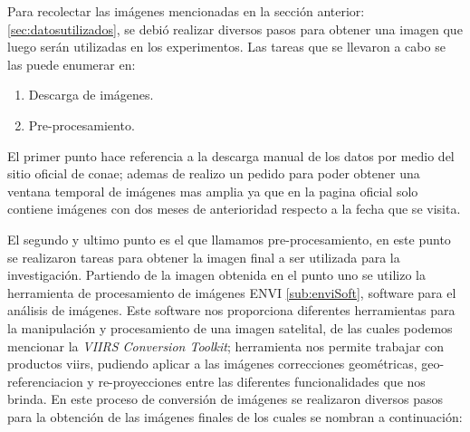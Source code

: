 Para recolectar las imágenes mencionadas en la sección anterior: \ref{sec:datosutilizados}, se debió realizar diversos pasos para obtener una imagen que luego serán utilizadas en los experimentos. Las tareas que se llevaron a cabo se las puede enumerar en:
\begin{enumerate}
	\item Descarga de imágenes.
	\item Pre-procesamiento.
\end{enumerate}

El primer punto hace referencia a la descarga manual de los datos por medio del sitio oficial de \ac{conae}; ademas de realizo un pedido para poder obtener una ventana temporal de imágenes mas amplia ya que en la pagina oficial solo contiene imágenes con dos meses de anterioridad respecto a la fecha que se visita.

El segundo y ultimo punto es el que llamamos pre-procesamiento, en este punto se realizaron tareas para obtener la imagen final a ser utilizada para la investigación.
Partiendo de la imagen obtenida en el punto uno se utilizo la herramienta de procesamiento de imágenes ENVI \ref{sub:enviSoft}, software para el análisis de imágenes. Este software nos proporciona diferentes herramientas para la manipulación y procesamiento  de  una imagen satelital, de las cuales podemos mencionar la \textit{VIIRS Conversion Toolkit}; herramienta nos permite trabajar con productos \ac{viirs}, pudiendo aplicar a las imágenes correcciones geométricas, geo-referenciacion y re-proyecciones entre las diferentes funcionalidades que nos brinda. En este proceso de conversión de imágenes se realizaron diversos pasos para la obtención de las imágenes finales de los cuales se nombran a continuación:


